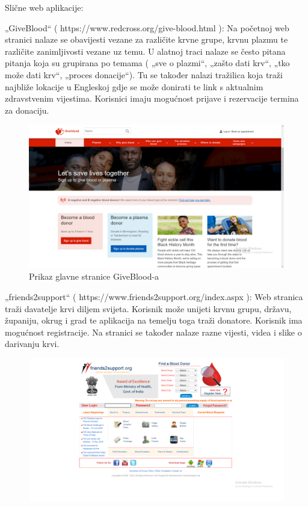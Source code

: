 		Slične web aplikacije:
		\begin{packed_item}
			\item  „GiveBlood“ ( https://www.redcross.org/give-blood.html ):
			Na početnoj web stranici nalaze se obavijesti vezane za različite krvne grupe, krvnu plazmu te različite zanimljivosti vezane uz temu. U alatnoj 					traci nalaze se često pitana pitanja koja su grupirana po temama ( „sve o plazmi“, „zašto dati krv“, „tko može dati krv“,  „proces donacije“). Tu se 			također nalazi tražilica koja traži najbliže lokacije u Engleskoj gdje se može donirati te link s aktualnim zdravstvenim vijestima. Korisnici imaju 					mogućnost prijave i rezervacije termina za donaciju.
			\begin{figure}[H]
				\includegraphics[scale=0.23]{slike/giveblood.PNG} 
				\centering
				\caption{Prikaz glavne stranice GiveBlood-a}
				\label{fig:promjene}
			\end{figure}
			\item „friends2support“ ( https://www.friends2support.org/index.aspx ):
			Web stranica traži davatelje krvi diljem svijeta. Korisnik može unijeti krvnu grupu, državu, županiju, okrug i grad te aplikacija na temelju toga 					traži donatore. Korisnik ima mogućnost registracije. Na stranici se također nalaze razne vijesti, videa i slike o darivanju krvi.
			\begin{figure}[H]
				\includegraphics[scale=0.23]{slike/friends2support.PNG} 

\end{figure}
\end{packed_item}
